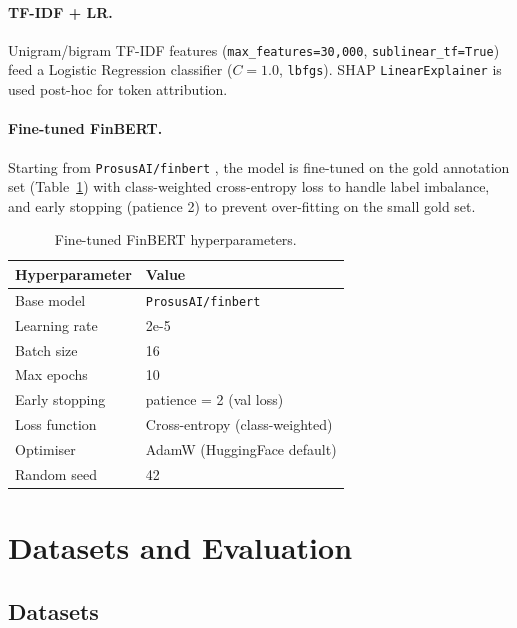 \documentclass[11pt]{article}
\begin{document}
\paragraph{TF-IDF + LR.} Unigram/bigram TF-IDF features
(\texttt{max\_features=30{,}000}, \texttt{sublinear\_tf=True}) feed a
Logistic Regression classifier ($C=1.0$, \texttt{lbfgs}). SHAP
\texttt{LinearExplainer} is used post-hoc for token attribution.

\paragraph{Fine-tuned FinBERT.} Starting from \texttt{ProsusAI/finbert}
\cite{araci2019finbert}, the model is fine-tuned on the gold annotation set
(Table~\ref{tab:hparams}) with class-weighted cross-entropy loss to handle
label imbalance, and early stopping (patience 2) to prevent over-fitting on
the small gold set.

\begin{table}[h]
\centering
\small
\begin{tabular}{ll}
\toprule
\textbf{Hyperparameter} & \textbf{Value} \\
\midrule
Base model           & \texttt{ProsusAI/finbert} \\
Learning rate        & 2e-5 \\
Batch size           & 16 \\
Max epochs           & 10 \\
Early stopping       & patience = 2 (val loss) \\
Loss function        & Cross-entropy (class-weighted) \\
Optimiser            & AdamW (HuggingFace default) \\
Random seed          & 42 \\
\bottomrule
\end{tabular}
\caption{Fine-tuned FinBERT hyperparameters.}
\label{tab:hparams}
\end{table}

\section{Datasets and Evaluation}
\label{sec:data}

\subsection{Datasets}
\end{document}
